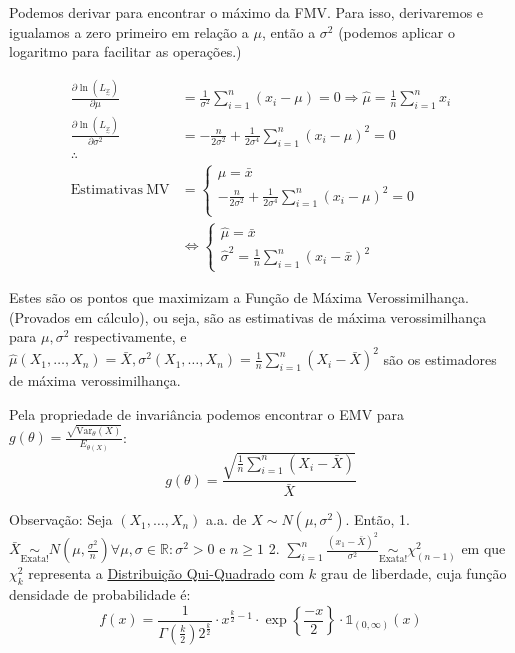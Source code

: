 \documentclass[
  letterpaper,
  DIV=11,
  numbers=noendperiod]{scrreprt}
\begin{document}
Podemos derivar para encontrar o máximo da FMV. Para isso, derivaremos e
igualamos a zero primeiro em relação a \(\mu\), então a \(\sigma^{2}\)
(podemos aplicar o logaritmo para facilitar as operações.)

\[
\begin{aligned}
\frac{\partial\ln(L_{\underset{\sim}{x}})}{\partial \mu} &= \frac{1}{\sigma^{2}}\sum\limits^{n}_{i=1}(x_{i}-\mu) =0
\Rightarrow \hat \mu =\frac{1}{n} \sum\limits^{n}_{i=1}x_{i} \\
\frac{\partial \ln(L_{\underset{\sim}{x}})}{\partial \sigma^{2}} &= - \frac{n}{2\sigma^{2}} + \frac{1}{2\sigma^{4}} 
\sum\limits^{n}_{i=1}(x_{i}-\mu)^{2} =0 \\
\therefore \\
\mathrm{Estimativas~ MV} & = 
\begin{cases}
\mu = \bar{x} \\
-\frac{n}{2\sigma^{2}} + \frac{1}{2 \sigma^{4}} \sum\limits^{n}_{i=1}(x_{i}-\mu)^{2}=0 \\
\end{cases} \\
&\Leftrightarrow \begin{cases}
\hat{\mu}=\bar{x} \\
\hat{\sigma}^{2}= \frac{1}{n}\sum\limits^{n}_{i=1}(x_{i}-\bar{x})^{2}
\end{cases}
\end{aligned}
\]

Estes são os pontos que maximizam a Função de Máxima Verossimilhança.
(Provados em cálculo), ou seja, são as estimativas de máxima
verossimilhança para \(\mu, \sigma^{2}\) respectivamente, e
\(\hat{\mu}(X_{1},\dots,X_{n})=\bar{X}, \sigma^{2}(X_{1},\dots,X_{n})=\frac{1}{n}\sum\limits^{n}_{i=1}(X_{i}-\bar{X})^{2}\)
são os estimadores de máxima verossimilhança.

Pela propriedade de invariância podemos encontrar o EMV para
\(g(\theta)= \frac{\sqrt{\mathrm{Var}_\theta(X)}}{E_{\theta(X)}}\): \[
\widehat{g(\theta)} = \frac{\sqrt{\frac{1}{n}\sum\limits^{n}_{i=1}(X_{i}-\bar{X})}}{\bar{X}}
\]

Observação: Seja \((X_{1},\dots,X_{n})\) a.a. de
\(X\sim N(\mu, \sigma^{2})\). Então, 1.
\(\bar{X} \underset{\text{Exata!}}{\sim}N\left(\mu, \frac{\sigma^{2}}{n}\right)\forall \mu, \sigma \in \mathbb{R} : \sigma^{2}>0 \text{ e } n\geq 1\)
2.
\(\sum\limits^{n}_{i=1} \frac{(x_{1}-\bar{X})^{2}}{\sigma^{2}}\underset{\text{Exata!}}{\sim}\chi^{2}_{(n-1)}\)
em que \(\chi^{2}_{k}\) representa a
\href{qui-quadrado.qmd}{Distribuição Qui-Quadrado} com \(k\) grau de
liberdade, cuja função densidade de probabilidade é: \[
f(x) = \frac{1}{\Gamma(\frac{k}{2})2^{\frac{k}{2}}} \cdot x^{\frac{k}{2}-1} \cdot \exp\left\{\frac{-x}{2}\right\} \cdot \mathbb{1}_{(0, \infty)}(x)
\]
\end{document}
